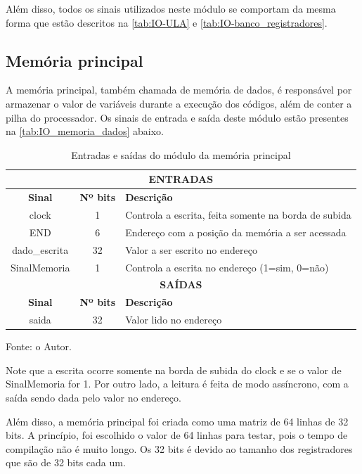 \documentclass[
	12pt,				%
	oneside,
	a4paper,			%
	english,			%
	french,				%
	spanish,			%
	brazil,				%
	]{abntex2}
\begin{document}
Além disso, todos os sinais utilizados neste módulo se comportam da mesma forma que estão descritos na \autoref{tab:IO-ULA} e \autoref{tab:IO-banco_registradores}.

\subsection{Memória principal}

A memória principal, também chamada de memória de dados, é responsável por armazenar o valor de variáveis durante a execução dos códigos, além de conter a pilha do processador. Os sinais de entrada e saída deste módulo estão presentes na \autoref{tab:IO_memoria_dados} abaixo.

\setlength{\tabcolsep}{10pt} %
\begin{table}[H]
\centering
\caption{Entradas e saídas do módulo da memória principal}
\label{tab:IO_memoria_dados}
\begin{tabular}{|c|c|l|}
\hline
\multicolumn{3}{|c|}{\textbf{ENTRADAS}} \\
\hline
\textbf{Sinal} & \textbf{Nº bits} & \textbf{Descrição} \\
\hline
clock & 1 & Controla a escrita, feita somente na borda de subida \\
\hline
END & 6 & Endereço com a posição da memória a ser acessada \\
\hline
dado\_escrita & 32 & Valor a ser escrito no endereço \\
\hline
SinalMemoria & 1 & Controla a escrita no endereço (1=sim, 0=não) \\
\hline
\multicolumn{3}{|c|}{\textbf{SAÍDAS}} \\
\hline
\textbf{Sinal} & \textbf{Nº bits} & \textbf{Descrição} \\
\hline
saida & 32 & Valor lido no endereço \\
\hline
\end{tabular}
\vspace{-0.5em}
\begin{center}
Fonte: o Autor.
\end{center}
\end{table}

Note que a escrita ocorre somente na borda de subida do clock e se o valor de SinalMemoria for 1. Por outro lado, a leitura é feita de modo assíncrono, com a saída sendo dada pelo valor no endereço.

Além disso, a memória principal foi criada como uma matriz de 64 linhas de 32 bits. A princípio, foi escolhido o valor de 64 linhas para testar, pois o tempo de compilação não é muito longo. Os 32 bits é devido ao tamanho dos registradores que são de 32 bits cada um.
\end{document}

